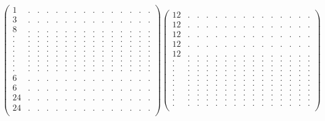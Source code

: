\documentclass[12pt,a4paper]{amsart}
\begin{document}
\begin{align*}
\left(\begin{array}{rrrrrrrrrrrrrrr}%
1&.&.&.&.&.&.&.&.&.&.&.&.&.&.\\%
3&.&.&.&.&.&.&.&.&.&.&.&.&.&.\\%
8&.&.&.&.&.&.&.&.&.&.&.&.&.&.\\%
.&.&.&.&.&.&.&.&.&.&.&.&.&.&.\\%
.&.&.&.&.&.&.&.&.&.&.&.&.&.&.\\%
.&.&.&.&.&.&.&.&.&.&.&.&.&.&.\\%
.&.&.&.&.&.&.&.&.&.&.&.&.&.&.\\%
.&.&.&.&.&.&.&.&.&.&.&.&.&.&.\\%
.&.&.&.&.&.&.&.&.&.&.&.&.&.&.\\%
.&.&.&.&.&.&.&.&.&.&.&.&.&.&.\\%
.&.&.&.&.&.&.&.&.&.&.&.&.&.&.\\%
6&.&.&.&.&.&.&.&.&.&.&.&.&.&.\\%
6&.&.&.&.&.&.&.&.&.&.&.&.&.&.\\%
24&.&.&.&.&.&.&.&.&.&.&.&.&.&.\\%
24&.&.&.&.&.&.&.&.&.&.&.&.&.&.\\%
\end{array}\right)%
\left(\begin{array}{rrrrrrrrrrrrrrr}%
12&.&.&.&.&.&.&.&.&.&.&.&.&.&.\\%
12&.&.&.&.&.&.&.&.&.&.&.&.&.&.\\%
12&.&.&.&.&.&.&.&.&.&.&.&.&.&.\\%
12&.&.&.&.&.&.&.&.&.&.&.&.&.&.\\%
12&.&.&.&.&.&.&.&.&.&.&.&.&.&.\\%
.&.&.&.&.&.&.&.&.&.&.&.&.&.&.\\%
.&.&.&.&.&.&.&.&.&.&.&.&.&.&.\\%
.&.&.&.&.&.&.&.&.&.&.&.&.&.&.\\%
.&.&.&.&.&.&.&.&.&.&.&.&.&.&.\\%
.&.&.&.&.&.&.&.&.&.&.&.&.&.&.\\%
.&.&.&.&.&.&.&.&.&.&.&.&.&.&.\\%
.&.&.&.&.&.&.&.&.&.&.&.&.&.&.\\%
.&.&.&.&.&.&.&.&.&.&.&.&.&.&.\\%
.&.&.&.&.&.&.&.&.&.&.&.&.&.&.\\%
.&.&.&.&.&.&.&.&.&.&.&.&.&.&.\\%
\end{array}\right)%
\end{align*}
\end{document}
